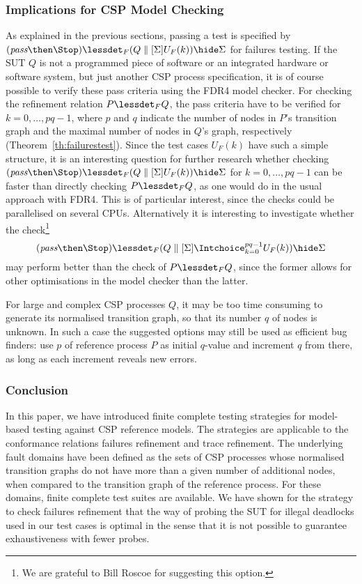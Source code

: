 \subsubsection*{Implications for CSP Model Checking}
As explained in the previous sections, passing a test is specified by
$(\epass\then\Stop) \lessdet_F (Q\parallel[\Sigma] U_F(k)) \hide \Sigma$ for
failures testing. If the SUT $Q$ is not a programmed piece of software or an
integrated hardware or software system, but just another CSP process
specification, it is of course possible to verify these pass criteria using
the FDR4 model checker. For checking the refinement relation $P\lessdet_F Q$,
the pass criteria have to be verified for $k=0,\dots,pq-1$, where $p$ and $q$
indicate the number of nodes in $P$'s transition graph and the maximal number
of nodes in $Q$'s graph, respectively (Theorem~\ref{th:failurestest}). Since
the test cases $U_F(k)$ have such a simple structure, it is an interesting
question for further research whether checking $(\epass\then\Stop) \lessdet_F
(Q\parallel[\Sigma] U_F(k)) \hide \Sigma$ for $k=0,\dots,pq-1$ can be faster
than directly checking $P\lessdet_F Q$, as one would do in the usual approach
with FDR4. This is of particular interest, since the checks could be
parallelised on several CPUs. Alternatively it is interesting to investigate
whether the check\footnote{We are grateful to Bill Roscoe for suggesting this
option.}
\[
(\epass\then\Stop) \lessdet_F (Q\parallel[\Sigma] \Intchoice_{k=0}^{pq-1} U_F(k)) \hide \Sigma
\]
may perform better than the check of $P\lessdet_F Q$, since the former allows for
other optimisations in the model checker than the latter.

For large and complex CSP processes $Q$, it may be too time consuming to
generate its normalised transition graph, so that its number $q$ of nodes is
unknown. In such a case the suggested options may still be used as efficient
bug finders: use  $p$ of reference process $P$ as initial $q$-value and
increment $q$ from there, as long as each increment reveals new errors.

\subsubsection*{Conclusion}

In this paper, we have introduced finite complete testing strategies for
model-based testing against CSP reference models. The strategies are
applicable to the conformance relations failures refinement and trace
refinement. The underlying fault domains have been defined as the sets of CSP
processes whose normalised transition graphs do not have more than a given
number of additional nodes, when compared to the transition graph of the
reference process. For these domains, finite complete test suites are
available. We have shown for the strategy to check failures refinement that
the way of probing the SUT for illegal deadlocks used in our test cases is
optimal in the sense that it is not possible to guarantee exhaustiveness with
fewer probes.

